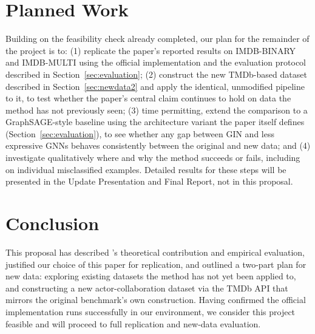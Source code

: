 \documentclass[11pt]{article}
\begin{document}
\section{Planned Work}
\label{sec:plan}
Building on the feasibility check already completed, our plan for the remainder of the project is to: (1) replicate the paper's reported results on IMDB-BINARY and IMDB-MULTI using the official implementation and the evaluation protocol described in Section~\ref{sec:evaluation}; (2) construct the new TMDb-based dataset described in Section~\ref{sec:newdata2} and apply the identical, unmodified pipeline to it, to test whether the paper's central claim continues to hold on data the method has not previously seen; (3) time permitting, extend the comparison to a GraphSAGE-style baseline using the architecture variant the paper itself defines (Section~\ref{sec:evaluation}), to see whether any gap between GIN and less expressive GNNs behaves consistently between the original and new data; and (4) investigate qualitatively where and why the method succeeds or fails, including on individual misclassified examples. Detailed results for these steps will be presented in the Update Presentation and Final Report, not in this proposal.

\section{Conclusion}
This proposal has described \citet{xu2019gin}'s theoretical contribution and empirical evaluation, justified our choice of this paper for replication, and outlined a two-part plan for new data: exploring existing datasets the method has not yet been applied to, and constructing a new actor-collaboration dataset via the TMDb API that mirrors the original benchmark's own construction. Having confirmed the official implementation runs successfully in our environment, we consider this project feasible and will proceed to full replication and new-data evaluation.


\end{document}
